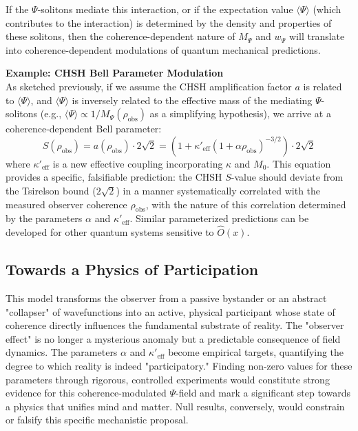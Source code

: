 \documentclass[11pt, a4paper]{book}
\begin{document}
If the $\Psi$-solitons mediate this interaction, or if the expectation value $\langle\Psi\rangle$ (which contributes to the interaction) is determined by the density and properties of these solitons, then the coherence-dependent nature of $M_\Psi$ and $w_\Psi$ will translate into coherence-dependent modulations of quantum mechanical predictions.

\textbf{Example: CHSH Bell Parameter Modulation} \\
As sketched previously, if we assume the CHSH amplification factor $a$ is related to $\langle\Psi\rangle$, and $\langle\Psi\rangle$ is inversely related to the effective mass of the mediating $\Psi$-solitons (e.g., $\langle\Psi\rangle \propto 1/M_\Psi(\rho_{\text{obs}})$ as a simplifying hypothesis), we arrive at a coherence-dependent Bell parameter:
\[ S(\rho_{\text{obs}}) = a(\rho_{\text{obs}}) \cdot 2\sqrt{2} = \left(1 + \kappa'_{\text{eff}} (1 + \alpha \rho_{\text{obs}})^{-3/2}\right) \cdot 2\sqrt{2} \]
where $\kappa'_{\text{eff}}$ is a new effective coupling incorporating $\kappa$ and $M_0$. This equation provides a specific, falsifiable prediction: the CHSH $S$-value should deviate from the Tsirelson bound ($2\sqrt{2}$) in a manner systematically correlated with the measured observer coherence $\rho_{\text{obs}}$, with the nature of this correlation determined by the parameters $\alpha$ and $\kappa'_{\text{eff}}$. Similar parameterized predictions can be developed for other quantum systems sensitive to $\hat{O}(x)$.

\subsection{Towards a Physics of Participation}
\label{ssec:coherencemodulation_participation}
This model transforms the observer from a passive bystander or an abstract "collapser" of wavefunctions into an active, physical participant whose state of coherence directly influences the fundamental substrate of reality. The "observer effect" is no longer a mysterious anomaly but a predictable consequence of field dynamics. The parameters $\alpha$ and $\kappa'_{\text{eff}}$ become empirical targets, quantifying the degree to which reality is indeed "participatory." Finding non-zero values for these parameters through rigorous, controlled experiments would constitute strong evidence for this coherence-modulated $\Psi$-field and mark a significant step towards a physics that unifies mind and matter. Null results, conversely, would constrain or falsify this specific mechanistic proposal.
\end{document}
